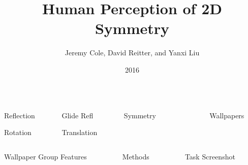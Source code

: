 \documentclass[final,hyperref={pdfpagelabels=false}]{beamer}
\title[Symmetry Perception]{Human Perception of 2D Symmetry}
\author[Cole \& Reitter \& Liu]{Jeremy Cole, David Reitter, and Yanxi Liu}
\institute[Penn State]{The Pennsylvania State University}
\date{2016}
\begin{document}
  \begin{frame}{} 
    \vfill
	\begin{columns}[t]
	\begin{column}{.12\linewidth}
	    	    		\begin{block}{Reflection}
	    	    		 
	    	    		\end{block}
	    	    		\vfill
	    	    		\begin{block}{Rotation}
	    	    		
	    	    		\end{block}
	    	    	\end{column}
	    	    	\begin{column}{.12\linewidth}
	    	    		\begin{block}{Glide Refl}
	    	    							 
	    		  		\end{block}
	    		  			\vfill
	    	    		\begin{block}{Translation}
	    	    	    		  
	    	    	    \end{block}
	    	    	    	\end{column}
		\begin{column}{0.24\linewidth}
			\begin{block}{Symmetry}
    		
    		\end{block}
    	\end{column}
    	    	\begin{column}{.24\linewidth}
    	   			   
    	    	\end{column}
    	  \begin{column}{0.24\linewidth}
    	  	\begin{block}{Wallpapers}
    	  		
    	  	\end{block}
    	  \end{column}
    \end{columns}
    \vfill
    
    \begin{columns}[t]
    \begin{column}{.32\linewidth}
        	       		\begin{block}{Wallpaper Group Features}
        	       		 	
        	       		 \end{block}
        	       		 
        	       	\end{column}
    	\begin{column}{.24\linewidth}
    	\begin{block}{Methods}
    	    	
    	    \end{block}
    	\end{column}
    	\begin{column}{.40\linewidth}
    	\begin{block}{Task Screenshot}
    		
    	\end{block}
    	\end{column}
    		

\end{columns}
\end{frame}
\end{document}
